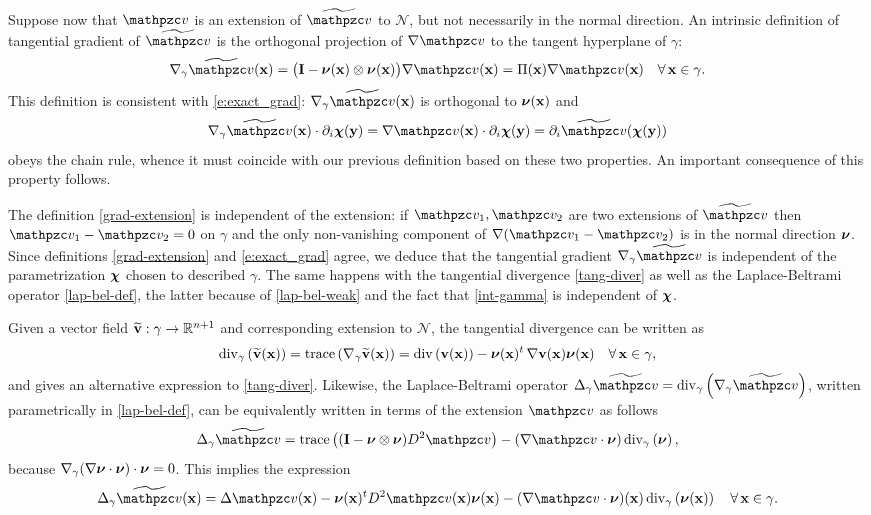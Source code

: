 Suppose now that $\tv$ is an extension of $\widetilde \tv$ to $\mathcal{N}$,
but not necessarily in the normal direction. An intrinsic definition of
tangential gradient of $\widetilde \tv$ is the orthogonal projection of
$\nabla \tv$ to the tangent hyperplane of $\gamma$:
%
\begin{equation}\label{grad-extension}
\nabla_\gamma \widetilde \tv(\bx) = \big(\bI - \bnu(\bx)\otimes\bnu(\bx) \big) \nabla\tv(\bx)
= \Pi(\bx) \nabla\tv(\bx)
\quad\forall \, \bx\in\gamma.
\end{equation}
%
This definition is consistent with \eqref{e:exact_grad}: $\nabla_\gamma \widetilde \tv(\bx)$
is orthogonal to ${\boldsymbol \nu}({\bf x})$ and
%
\[
\nabla_\gamma \widetilde \tv(\bx) \cdot \partial_i\bchi(\by) =
\nabla \tv(\bx) \cdot \partial_i\bchi(\by) =
\partial_i \widetilde \tv(\bchi(\by))
\]
%
obeys the chain rule, whence it must coincide with our previous definition
based on these two properties. An important consequence of this property follows.
%
\begin{remark}\label{R:param-indep}
  The definition \eqref{grad-extension} is independent of the extension:
  if $\tv_1,\tv_2$ are two extensions of $\widetilde \tv$ then $\tv_1-\tv_2 = 0$ on $\gamma$
  and the only non-vanishing component of $\nabla(\tv_1-\tv_2)$ is in the normal
  direction ${\boldsymbol \nu}$. Since definitions \eqref{grad-extension} and \eqref{e:exact_grad}
  agree, we deduce that the tangential gradient $\nabla_\gamma \widetilde \tv$ is independent
  of the parametrization ${\boldsymbol \chi}$ chosen to described $\gamma$. The same happens
  with the tangential divergence \eqref{tang-diver} as well as the
  Laplace-Beltrami operator \eqref{lap-bel-def}, the latter
  because of \eqref{lap-bel-weak}
  and the fact that \eqref{int-gamma} is independent of ${\boldsymbol \chi}$.
\end{remark}  

Given a vector field $\widetilde{{\bf v}}:\gamma\to\mathbb{R}^{n+1}$ and corresponding
extension to $\mathcal{N}$, the tangential divergence can be written as
%
\[
\mathrm{div}_\gamma\left( \widetilde {{\bf v}}({\bf x}) \right) = \mathrm{trace}\left( \nabla_\gamma \widetilde {{\bf v}}({\bf x}) \right)
= \mathrm{div}\left( {\bf v}({\bf x}) \right) - {\boldsymbol \nu}({\bf x})^t \, \nabla {\bf v}({\bf x}) {\boldsymbol \nu}({\bf x})
\quad\forall \, {\bf x}\in\gamma,
\]
%
and gives an alternative expression to \eqref{tang-diver}. Likewise, the
Laplace-Beltrami operator $\Delta_\gamma \widetilde\tv = \divg{\nabla_\gamma \widetilde \tv}$,
written parametrically in \eqref{lap-bel-def},
can be equivalently written in terms of the extension $\tv$ as follows
%
\[
\Delta_\gamma \widetilde \tv = \trace{(\bI-\bnu\otimes\bnu)D^2\tv} - (\nabla\tv\cdot\bnu)
\, \divg{\bnu},
\]
%
because $\nabla_\gamma(\nabla{\boldsymbol \nu}\cdot{\boldsymbol \nu}) \cdot {\boldsymbol \nu} = 0$. This implies the
expression
%
\[
\Delta_\gamma \widetilde \tv(\bx) = \Delta \tv(\bx) - \bnu(\bx)^t D^2\tv(\bx) \bnu(\bx)
- (\nabla\tv\cdot\bnu)(\bx) \, \divg{\bnu(\bx)}
\quad\forall \, \bx\in\gamma.
\]

